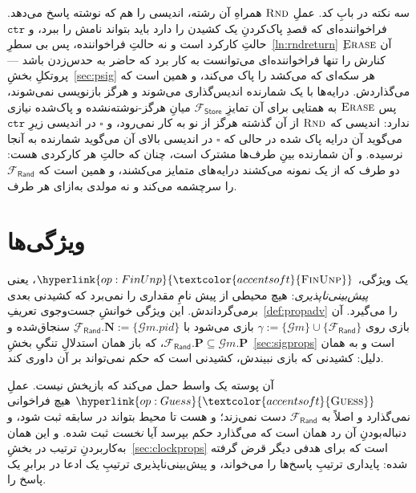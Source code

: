 \documentclass[10pt,oneside,openany]{book}
\newcommand{\Ps}{\mathbf{P}}
\newcommand{\PID}{\mathit{pid}}
\newcommand{\admits}{\mathbf{N}}
\newcommand{\op}[1]{\textnormal{\textsc{#1}}}
\newcommand{\opl}[1]{\hyperlink{op:#1}{\textcolor{accentsoft}{\op{#1}}}}
\newcommand{\Gm}{\mathcal{G}m}
\newcommand{\Frand}{\mathcal{F}_{\mathsf{Rand}}}
\newcommand{\Fstore}{\mathcal{F}_{\mathsf{Store}}}
\newcommand{\unset}{\square}
\newcommand{\V}[1]{\mathtt{#1}}
\theoremstyle{accentdef}
\theoremstyle{accentplain}
\begin{document}
سه نکته در بابِ کد. عملِ $\op{Rnd}$ همراهِ آن رشته، اندیسی را هم که نوشته
پاسخ می‌دهد. فراخواننده‌ای که قصدِ پاک‌کردنِ یک کشیدن را دارد باید بتواند
نامش را ببرد، و $\V{ctr}$ حالتِ کارکرد است و نه حالتِ فراخواننده، پس بی
سطرِ~\ref{ln:rndreturn} آن $\op{Erase}$ِ کنارش را تنها فراخواننده‌ای
می‌توانست به کار برد که حاضر به حدس‌زدن باشد --- پروتکلِ
بخشِ~\ref{sec:psig} هر سکه‌ای که می‌کشد را پاک می‌کند، و همین است که
می‌گذاردش. درایه‌ها با یک شمارنده اندیس‌گذاری می‌شوند و هرگز بازنویسی
نمی‌شوند، پس $\op{Erase}$ به همتایی برای آن تمایزِ $\Fstore$ میانِ
هرگز-نوشته‌نشده و پاک‌شده نیازی ندارد: اندیسی که $\op{Rnd}$ از آن گذشته
هرگز از نو به کار نمی‌رود، و $\unset$ در اندیسی زیرِ $\V{ctr}$ می‌گوید آن
درایه پاک شده در حالی که $\unset$ در اندیسی بالای آن می‌گوید شمارنده به
آنجا نرسیده. و آن شمارنده بینِ طرف‌ها مشترک است، چنان که حالتِ هر کارکردی
هست: دو طرف که از یک نمونه می‌کشند درایه‌های متمایز می‌کشند، و همین است که
$\Frand$ را سرچشمه می‌کند و نه مولدی به‌ازای هر طرف.

\section{ویژگی‌ها}\label{sec:randprops}

یک ویژگی، $\opl{FinUnp}$، یعنی \emph{پیش‌بینی‌ناپذیری}: هیچ محیطی از پیش
نامِ مقداری را نمی‌برد که کشیدنی بعدی برمی‌گرداندش. این ویژگی خوانشِ
جست‌وجوی تعریفِ~\ref{def:propadv} را می‌گیرد. آن بازی روی $\gamma :=
\{\Gm\} \cup \{\Frand\}$ بازی می‌شود با $\Frand.\admits := \{\Gm.\PID\}$ِ
سنجاق‌شده و $\Frand.\Ps \subseteq \Gm.\Ps$، که باز همان استدلالِ تنگیِ
بخشِ~\ref{sec:sigprops} است و به همان دلیل: کشیدنی که بازی نبیندش، کشیدنی
است که حکم نمی‌تواند بر آن داوری کند.

آن پوسته یک واسط حمل می‌کند که بازپخش نیست. عملِ $\opl{Guess}$ هیچ فراخوانی
نمی‌گذارد و اصلاً به $\Frand$ دست نمی‌زند؛ و هست تا محیط بتواند در سابقه
ثبت شود، و دنباله‌بودنِ آن رد همان است که می‌گذارد حکم بپرسد آیا
\emph{نخست} ثبت شده. و این همان به‌کاربردنِ ترتیب در
بخشِ~\ref{sec:clockprops} است که برای هدفی دیگر قرض گرفته شده: پایداری
ترتیبِ پاسخ‌ها را می‌خواند، و پیش‌بینی‌ناپذیری ترتیبِ یک ادعا در برابرِ یک
پاسخ را.
\end{document}
